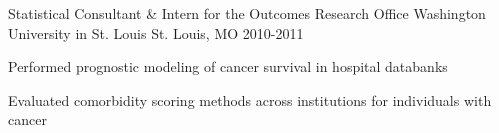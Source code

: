 \begin{cventries}
\cventry
{Statistical Consultant \& Intern for the Outcomes Research Office} %
{Washington University in St. Louis} %
{St. Louis, MO} %
{2010-2011} %
{
	\begin{cvitems} %
		\item {Performed prognostic modeling of cancer survival in hospital databanks}
		\item {Evaluated comorbidity scoring methods across institutions for individuals with cancer}
	\end{cvitems}
}



\end{cventries}
